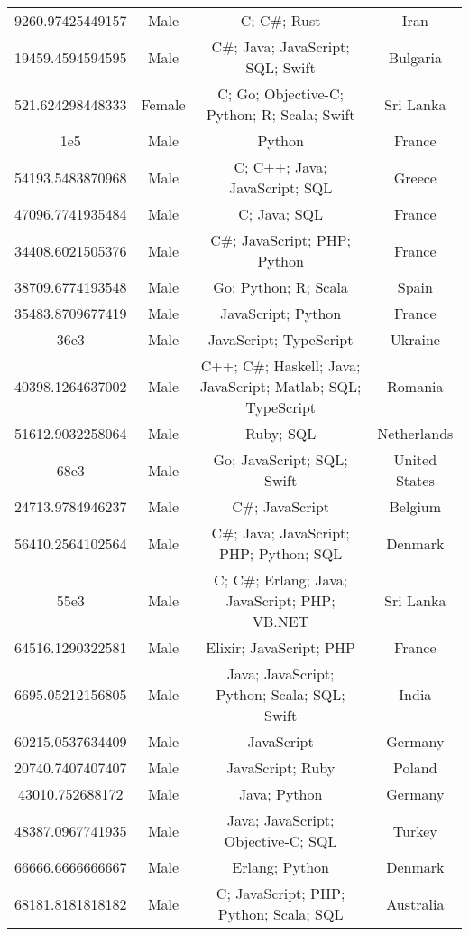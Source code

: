 \begin{center}
\begin{tabular}{ |c|c|c|c| }
9260.97425449157  &  Male  &  C; C\#; Rust  &  Iran  \\ 
19459.4594594595  &  Male  &  C\#; Java; JavaScript; SQL; Swift  &  Bulgaria  \\ 
521.624298448333  &  Female  &  C; Go; Objective-C; Python; R; Scala; Swift  &  Sri Lanka  \\ 
1e5  &  Male  &  Python  &  France  \\ 
54193.5483870968  &  Male  &  C; C++; Java; JavaScript; SQL  &  Greece  \\ 
47096.7741935484  &  Male  &  C; Java; SQL  &  France  \\ 
34408.6021505376  &  Male  &  C\#; JavaScript; PHP; Python  &  France  \\ 
38709.6774193548  &  Male  &  Go; Python; R; Scala  &  Spain  \\ 
35483.8709677419  &  Male  &  JavaScript; Python  &  France  \\ 
36e3  &  Male  &  JavaScript; TypeScript  &  Ukraine  \\ 
40398.1264637002  &  Male  &  C++; C\#; Haskell; Java; JavaScript; Matlab; SQL; TypeScript  &  Romania  \\ 
51612.9032258064  &  Male  &  Ruby; SQL  &  Netherlands  \\ 
68e3  &  Male  &  Go; JavaScript; SQL; Swift  &  United States  \\ 
24713.9784946237  &  Male  &  C\#; JavaScript  &  Belgium  \\ 
56410.2564102564  &  Male  &  C\#; Java; JavaScript; PHP; Python; SQL  &  Denmark  \\ 
55e3  &  Male  &  C; C\#; Erlang; Java; JavaScript; PHP; VB.NET  &  Sri Lanka  \\ 
64516.1290322581  &  Male  &  Elixir; JavaScript; PHP  &  France  \\ 
6695.05212156805  &  Male  &  Java; JavaScript; Python; Scala; SQL; Swift  &  India  \\ 
60215.0537634409  &  Male  &  JavaScript  &  Germany  \\ 
20740.7407407407  &  Male  &  JavaScript; Ruby  &  Poland  \\ 
43010.752688172  &  Male  &  Java; Python  &  Germany  \\ 
48387.0967741935  &  Male  &  Java; JavaScript; Objective-C; SQL  &  Turkey  \\ 
66666.6666666667  &  Male  &  Erlang; Python  &  Denmark  \\ 
68181.8181818182  &  Male  &  C; JavaScript; PHP; Python; Scala; SQL  &  Australia  \\ 

\end{tabular}
\end{center}

